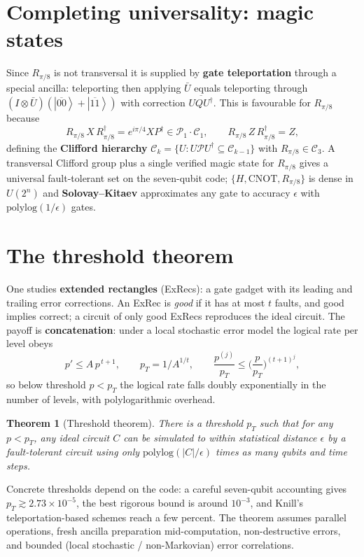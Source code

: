 \documentclass[11pt]{article}
\newcommand{\ket}[1]{\left|#1\right\rangle}
\theoremstyle{plain}
\newtheorem*{theorem*}{Theorem}
\begin{document}
\section{Completing universality: magic states}
Since $R_{\pi/8}$ is not transversal it is supplied by \textbf{gate teleportation} through a special
ancilla: teleporting then applying $\bar U$ equals teleporting through
$(I\otimes\bar U)(\ket{\overline{00}}+\ket{\overline{11}})$ with correction $\overline{UQU^\dagger}$.
This is favourable for $R_{\pi/8}$ because
\[ R_{\pi/8}\,X\,R_{\pi/8}^\dagger = e^{i\pi/4} X P^\dagger \in \mathcal P_1\cdot\mathcal C_1,\qquad
   R_{\pi/8}\,Z\,R_{\pi/8}^\dagger = Z, \]
defining the \textbf{Clifford hierarchy} $\mathcal C_k=\{U:U\mathcal P U^\dagger\subseteq\mathcal C_{k-1}\}$
with $R_{\pi/8}\in\mathcal C_3$. A transversal Clifford group plus a single verified magic state for
$R_{\pi/8}$ gives a universal fault-tolerant set on the seven-qubit code; $\{H,\text{CNOT},R_{\pi/8}\}$
is dense in $U(2^n)$ and \textbf{Solovay--Kitaev} approximates any gate to accuracy $\epsilon$ with
$\mathrm{polylog}(1/\epsilon)$ gates.

\section{The threshold theorem}
One studies \textbf{extended rectangles} (ExRecs): a gate gadget with its leading and trailing error
corrections. An ExRec is \emph{good} if it has at most $t$ faults, and good implies correct; a circuit
of only good ExRecs reproduces the ideal circuit. The payoff is \textbf{concatenation}: under a local
stochastic error model the logical rate per level obeys
\[ p' \le A\,p^{\,t+1},\qquad p_T = 1/A^{1/t},\qquad
   \frac{p^{(j)}}{p_T} \le \Big(\frac{p}{p_T}\Big)^{(t+1)^j}, \]
so below threshold $p<p_T$ the logical rate falls doubly exponentially in the number of levels, with
polylogarithmic overhead.

\begin{theorem*}[Threshold theorem]
There is a threshold $p_T$ such that for any $p<p_T$, any ideal circuit $C$ can be simulated to within
statistical distance $\epsilon$ by a fault-tolerant circuit using only $\mathrm{polylog}(|C|/\epsilon)$
times as many qubits and time steps.
\end{theorem*}

\noindent Concrete thresholds depend on the code: a careful seven-qubit accounting gives
$p_T\gtrsim 2.73\times10^{-5}$, the best rigorous bound is around $10^{-3}$, and Knill's
teleportation-based schemes reach a few percent. The theorem assumes parallel operations, fresh ancilla
preparation mid-computation, non-destructive errors, and bounded (local stochastic / non-Markovian)
error correlations.
\end{document}
